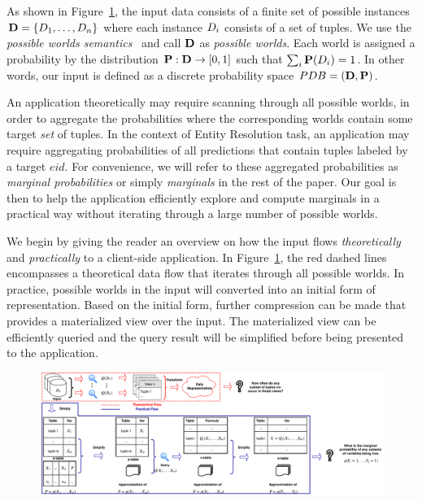 As shown in Figure~\ref{fig:systemoverview}, the input data consists of a finite set of possible instances $\mathbf{D}=\{D_1,\ldots,D_n\}$ where each instance $D_i$ consists of a set of tuples.
We use the \emph{possible worlds semantics}~\cite{Dalvi:2009:PDD:1538788.1538810} and call $\mathbf{D}$ as \emph{possible worlds}.
Each world is assigned a probability by the distribution $\mathbf{P} : \mathbf{D} \to [0,1]$ such that $\sum_i \mathbf{P}(D_i) = 1$.
In other words, our input is defined as a discrete probability space $PDB=(\mathbf{D},\mathbf{P})$.

An application theoretically may require scanning through all possible worlds, in order to aggregate the probabilities where the corresponding worlds contain some target \emph{set} of tuples.
In the context of Entity Resolution task, an application may require aggregating probabilities of all predictions that contain tuples labeled by a target $eid$. 
For convenience, we will refer to these aggregated probabilities as \emph{marginal probabilities} or simply \emph{marginals} in the rest of the paper.
Our goal is then to help the application efficiently explore and compute marginals in a practical way without iterating through a large number of possible worlds.

We begin by giving the reader an overview on how the input flows \emph{theoretically} and \emph{practically} to a client-side application.
In Figure~\ref{fig:systemoverview}, the red dashed lines encompasses a theoretical data flow that iterates through all possible worlds.
In practice, possible worlds in the input will converted into an initial form of representation.
Based on the initial form, further compression can be made that provides a materialized view over the input.
The materialized view can be efficiently queried and the query result will be simplified before being presented to the application.

\begin{figure}[ht!]
    \centering 
     \includegraphics[width=\textwidth]{ProbabilisticDatabaseSummarization/graphics/Data_Flow_Diagram.pdf}
     
 \label{fig:systemoverview} 
 \trimfigurewhitespace
\end{figure} 

